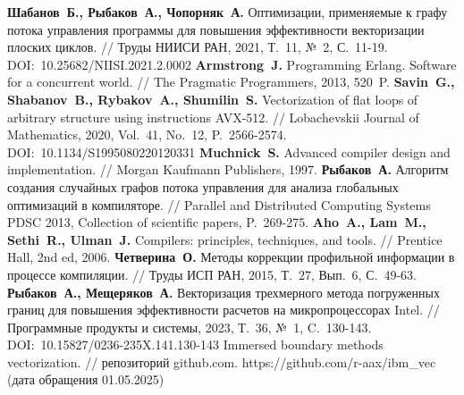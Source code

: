 \begin{thebibliography}{99}
\textbf{Шабанов~Б., Рыбаков~А., Чопорняк~А.} Оптимизации, применяемые к графу потока управления программы для повышения эффективности векторизации плоских циклов. // Труды НИИСИ РАН, 2021, Т.~11, №~2, С.~11-19. DOI:~10.25682/NIISI.2021.2.0002
\textbf{Armstrong~J.} Programming Erlang. Software for a concurrent world. // The Pragmatic Programmers, 2013, 520~P.
\textbf{Savin~G., Shabanov~B., Rybakov~A., Shumilin~S.} Vectorization of flat loops of arbitrary structure using instructions AVX-512. // Lobachevskii Journal of Mathematics, 2020, Vol.~41, No.~12, P.~2566-2574. DOI:~10.1134/S1995080220120331
\textbf{Muchnick~S.} Advanced compiler design and implementation. // Morgan Kaufmann Publishers, 1997.
\textbf{Рыбаков~А.} Алгоритм создания случайных графов потока управления для анализа глобальных оптимизаций в компиляторе. // Parallel and Distributed Computing Systems PDSC 2013, Collection of scientific papers, P.~269-275.
\textbf{Aho~A., Lam~M., Sethi~R., Ulman~J.} Compilers: principles, techniques, and tools. // Prentice Hall, 2nd ed, 2006.
\textbf{Четверина~О.} Методы коррекции профильной информации в процессе компиляции. // Труды ИСП РАН, 2015, Т.~27, Вып.~6, С.~49-63.
\textbf{Рыбаков~А., Мещеряков~А.} Векторизация трехмерного метода погруженных границ для повышения эффективности расчетов на микропроцессорах Intel. // Программные продукты и системы, 2023, Т.~36, №~1, C.~130-143. DOI:~10.15827/0236-235X.141.130-143
Immersed boundary methods vectorization. // репозиторий github.com. https://github.com/r-aax/ibm\_vec (дата обращения 01.05.2025)


\end{thebibliography}
